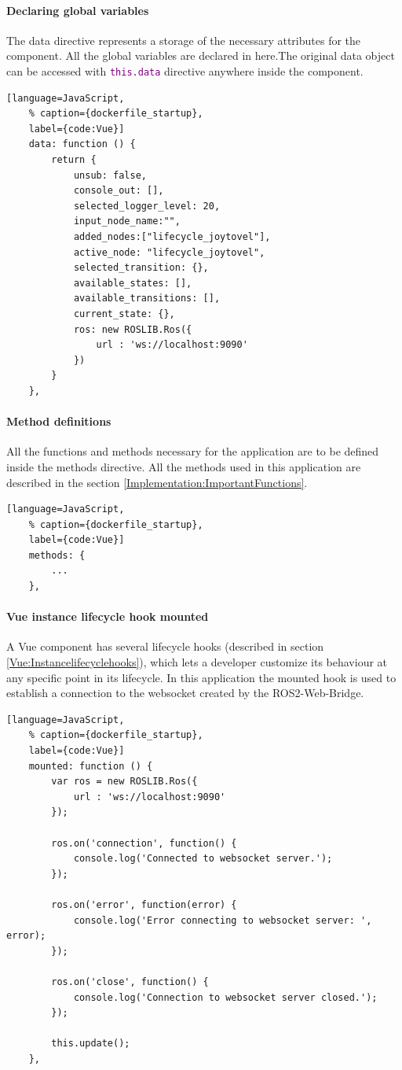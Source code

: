 \paragraph{Declaring global variables} The data directive represents a storage of the necessary attributes for the component. All the global variables are declared in here.The original data object can be accessed with \texttt{\textcolor{purple}{this.data}} directive anywhere inside the component.
\begin{lstlisting}[language=JavaScript,
	% caption={dockerfile_startup}, 
	label={code:Vue}]
	data: function () {
		return {
			unsub: false,
			console_out: [],
			selected_logger_level: 20,
			input_node_name:"",
			added_nodes:["lifecycle_joytovel"],
			active_node: "lifecycle_joytovel",
			selected_transition: {},
			available_states: [],
			available_transitions: [],
			current_state: {},
			ros: new ROSLIB.Ros({
				url : 'ws://localhost:9090'
			})
		}
	},
\end{lstlisting}

\paragraph{Method definitions} All the functions and methods necessary for the application are to be defined inside the methods directive. All the methods used in this application are described in the section \ref{Implementation:ImportantFunctions}.
\begin{lstlisting}[language=JavaScript,
	% caption={dockerfile_startup}, 
	label={code:Vue}]
	methods: {
		...
	},
\end{lstlisting}


\paragraph{Vue instance lifecycle hook mounted} A Vue component has several lifecycle hooks (described in section \ref{Vue:Instancelifecyclehooks}), which lets a developer customize its behaviour at any specific point in its lifecycle. In this application the mounted hook is used to establish a connection to the websocket created by the ROS2-Web-Bridge.
\begin{lstlisting}[language=JavaScript,
	% caption={dockerfile_startup}, 
	label={code:Vue}]
	mounted: function () {
		var ros = new ROSLIB.Ros({
			url : 'ws://localhost:9090'
		});

		ros.on('connection', function() {
			console.log('Connected to websocket server.');
		});

		ros.on('error', function(error) {
			console.log('Error connecting to websocket server: ', error);
		});

		ros.on('close', function() {
			console.log('Connection to websocket server closed.');
		});

		this.update();
	},
\end{lstlisting}

